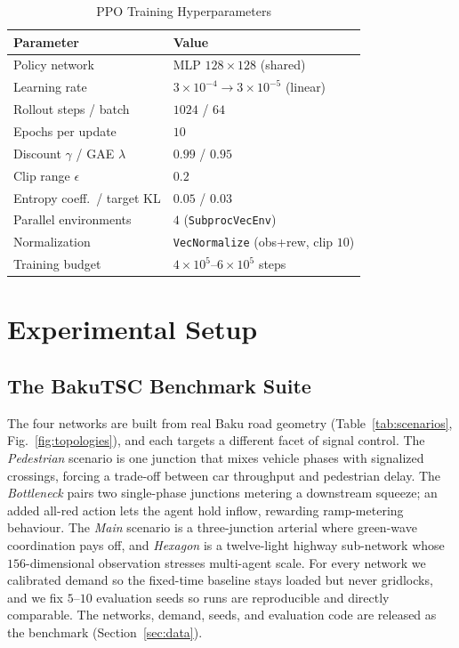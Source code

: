 \documentclass[conference,a4paper]{IEEEtran}
\begin{document}
\begin{table}[t]
\caption{PPO Training Hyperparameters}
\label{tab:hyper}
\centering
\small
\begin{tabular}{@{}ll@{}}
\toprule
\textbf{Parameter} & \textbf{Value} \\
\midrule
Policy network          & MLP $128\times128$ (shared) \\
Learning rate           & $3\!\times\!10^{-4}\!\rightarrow\!3\!\times\!10^{-5}$ (linear) \\
Rollout steps / batch   & $1024$ / $64$ \\
Epochs per update       & $10$ \\
Discount $\gamma$ / GAE $\lambda$ & $0.99$ / $0.95$ \\
Clip range $\epsilon$   & $0.2$ \\
Entropy coeff.\ / target KL & $0.05$ / $0.03$ \\
Parallel environments   & $4$ (\texttt{SubprocVecEnv}) \\
Normalization           & \texttt{VecNormalize} (obs+rew, clip $10$) \\
Training budget         & $4\!\times\!10^{5}$--$6\!\times\!10^{5}$ steps \\
\bottomrule
\end{tabular}
\end{table}

\section{Experimental Setup}
\subsection{The BakuTSC Benchmark Suite}
\label{sec:suite}
The four networks are built from real Baku road geometry
(Table~\ref{tab:scenarios}, Fig.~\ref{fig:topologies}), and each targets a
different facet of signal control. The \emph{Pedestrian} scenario is one junction
that mixes vehicle phases with signalized crossings, forcing a trade-off between
car throughput and pedestrian delay. The \emph{Bottleneck} pairs two
single-phase junctions metering a downstream squeeze; an added all-red action
lets the agent hold inflow, rewarding ramp-metering behaviour. The \emph{Main}
scenario is a three-junction arterial where green-wave coordination pays off, and
\emph{Hexagon} is a twelve-light highway sub-network whose $156$-dimensional
observation stresses multi-agent scale. For every network we calibrated demand so
the fixed-time baseline stays loaded but never gridlocks, and we fix $5$--$10$
evaluation seeds so runs are reproducible and directly comparable. The networks,
demand, seeds, and evaluation code are released as the benchmark
(Section~\ref{sec:data}).
\end{document}
